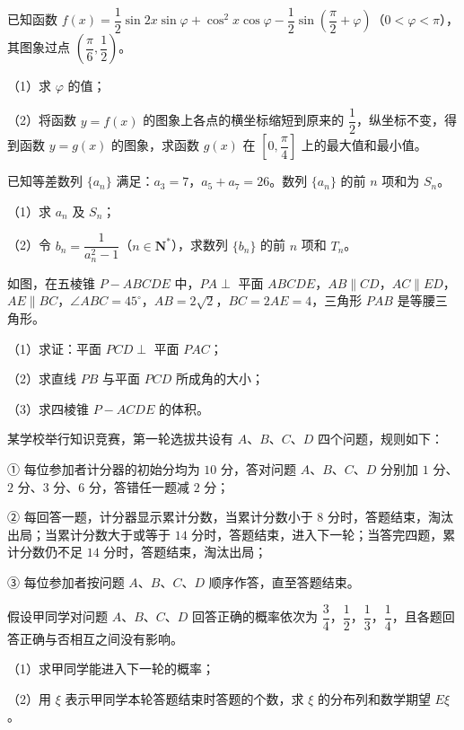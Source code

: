 \begin{question}
已知函数 $f(x)=\dfrac12\sin2x\sin\varphi+\cos^2x\cos\varphi-\dfrac12\sin\left(\dfrac\pi2+\varphi\right)$（$0<\varphi<\pi$），其图象过点 $\left(\dfrac\pi6,\dfrac12\right)$。

（1）求 $\varphi$ 的值；

（2）将函数 $y=f(x)$ 的图象上各点的横坐标缩短到原来的 $\dfrac12$，纵坐标不变，得到函数 $y=g(x)$ 的图象，求函数 $g(x)$ 在 $\left[0,\dfrac\pi4\right]$ 上的最大值和最小值。

\end{question}
\begin{question}
已知等差数列 $\{a_n\}$ 满足：$a_3=7$，$a_5+a_7=26$。数列 $\{a_n\}$ 的前 $n$ 项和为 $S_n$。

（1）求 $a_n$ 及 $S_n$；

（2）令 $b_n=\dfrac1{a_n^2-1}$（$n\in\mathbf N^*$），求数列 $\{b_n\}$ 的前 $n$ 项和 $T_n$。

\Needspace{0.4\textheight}
\end{question}
\begingroup
\renewenvironment{question}{\Needspace{0.5\textheight}}{}
\begin{question}
如图，在五棱锥 $P-ABCDE$ 中，$PA\perp$ 平面 $ABCDE$，$AB\parallel CD$，$AC\parallel ED$，$AE\parallel BC$，$\angle ABC=45^\circ$，$AB=2\sqrt2$，$BC=2AE=4$，三角形 $PAB$ 是等腰三角形。

（1）求证：平面 $PCD\perp$ 平面 $PAC$；

（2）求直线 $PB$ 与平面 $PCD$ 所成角的大小；

（3）求四棱锥 $P-ACDE$ 的体积。
\nopagebreak[4]
\begin{center}\end{center}
\nopagebreak[4]
\end{question}
\endgroup
\begin{question}
某学校举行知识竞赛，第一轮选拔共设有 $A$、$B$、$C$、$D$ 四个问题，规则如下：

① 每位参加者计分器的初始分均为 $10$ 分，答对问题 $A$、$B$、$C$、$D$ 分别加 $1$ 分、$2$ 分、$3$ 分、$6$ 分，答错任一题减 $2$ 分；

② 每回答一题，计分器显示累计分数，当累计分数小于 $8$ 分时，答题结束，淘汰出局；当累计分数大于或等于 $14$ 分时，答题结束，进入下一轮；当答完四题，累计分数仍不足 $14$ 分时，答题结束，淘汰出局；

③ 每位参加者按问题 $A$、$B$、$C$、$D$ 顺序作答，直至答题结束。

假设甲同学对问题 $A$、$B$、$C$、$D$ 回答正确的概率依次为 $\dfrac34$，$\dfrac12$，$\dfrac13$，$\dfrac14$，且各题回答正确与否相互之间没有影响。

（1）求甲同学能进入下一轮的概率；

（2）用 $\xi$ 表示甲同学本轮答题结束时答题的个数，求 $\xi$ 的分布列和数学期望 $E\xi$。

\Needspace{0.4\textheight}
\end{question}
